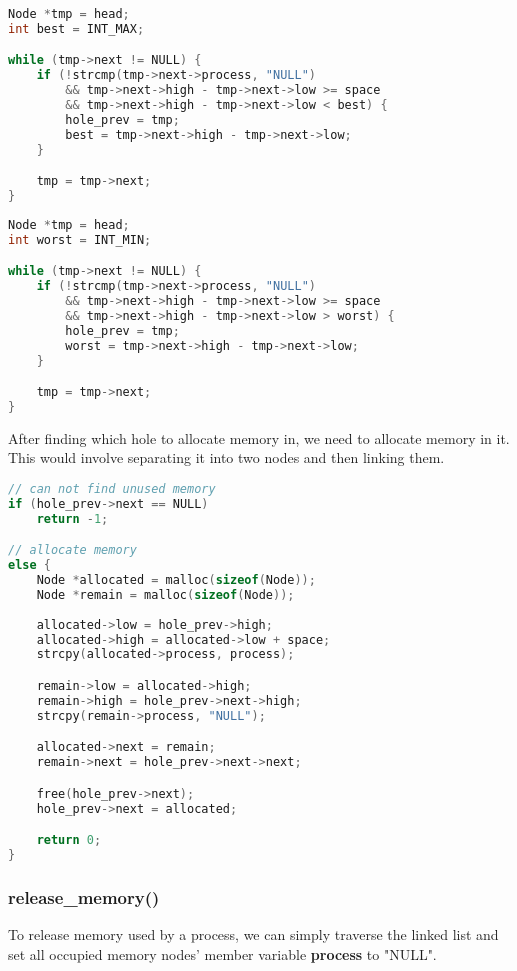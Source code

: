 \documentclass{article}
\begin{document}
\begin{lstlisting}[language=c, caption={Finding the Hole with Best-fit Strategy}]
Node *tmp = head;
int best = INT_MAX;

while (tmp->next != NULL) {
    if (!strcmp(tmp->next->process, "NULL") 
        && tmp->next->high - tmp->next->low >= space 
        && tmp->next->high - tmp->next->low < best) {
        hole_prev = tmp;
        best = tmp->next->high - tmp->next->low;
    }

    tmp = tmp->next;
}
\end{lstlisting}

\begin{lstlisting}[language=c, caption={Finding the Hole with Worst-fit Strategy}]
Node *tmp = head;
int worst = INT_MIN;

while (tmp->next != NULL) {
    if (!strcmp(tmp->next->process, "NULL") 
        && tmp->next->high - tmp->next->low >= space 
        && tmp->next->high - tmp->next->low > worst) {
        hole_prev = tmp;
        worst = tmp->next->high - tmp->next->low;
    }

    tmp = tmp->next;
}
\end{lstlisting}

After finding which hole to allocate memory in, we need to allocate memory in it. This would involve separating it into two nodes and then linking them.    

\begin{lstlisting}[language=c, caption={Allocating Memory in the Hole}]
// can not find unused memory
if (hole_prev->next == NULL)
    return -1;

// allocate memory
else {
    Node *allocated = malloc(sizeof(Node));
    Node *remain = malloc(sizeof(Node));
    
    allocated->low = hole_prev->high;
    allocated->high = allocated->low + space;
    strcpy(allocated->process, process);

    remain->low = allocated->high;
    remain->high = hole_prev->next->high;
    strcpy(remain->process, "NULL");

    allocated->next = remain;
    remain->next = hole_prev->next->next;

    free(hole_prev->next);
    hole_prev->next = allocated;

    return 0;
}
\end{lstlisting}

\subsubsection*{release\_memory()}
To release memory used by a process, we can simply traverse the linked list and set all occupied memory nodes' member variable \textbf{process} to "NULL".
\end{document}
